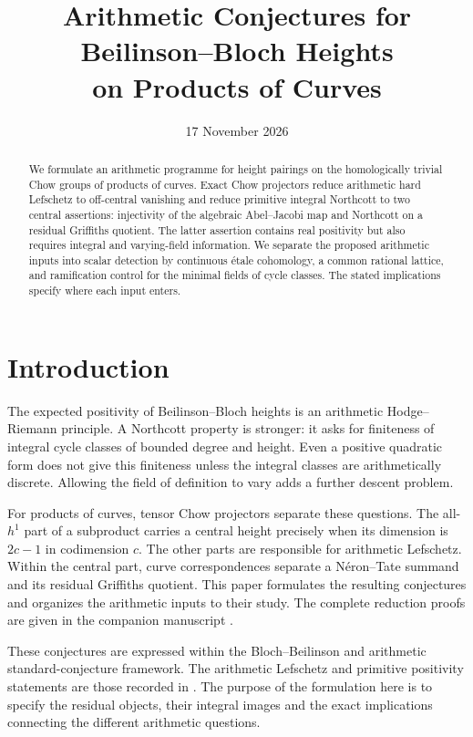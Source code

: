 \documentclass[11pt,a4paper]{article}
\title{Arithmetic Conjectures for Beilinson--Bloch Heights\\
on Products of Curves}
\author{}
\date{17 November 2026}
\theoremstyle{definition}
\numberwithin{equation}{section}
\begin{document}
\maketitle
\begin{abstract}
We formulate an arithmetic programme for height pairings on the
homologically trivial Chow groups of products of curves. Exact
Chow projectors reduce arithmetic hard Lefschetz to off-central
vanishing and reduce primitive integral Northcott to two central
assertions: injectivity of the algebraic Abel--Jacobi map and
Northcott on a residual Griffiths quotient. The latter assertion
contains real positivity but also requires integral and
varying-field information. We separate the proposed arithmetic
inputs into scalar detection by continuous étale cohomology,
a common rational lattice, and ramification control for the
minimal fields of cycle classes. The stated implications specify
where each input enters.
\end{abstract}
{\hypersetup{linkcolor=MathSectionLink}\tableofcontents}

\section{Introduction}\label{sec:introduction}

The expected positivity of Beilinson--Bloch heights is an arithmetic
Hodge--Riemann principle. A Northcott property is stronger: it asks
for finiteness of integral cycle classes of bounded degree and
height. Even a positive quadratic form does not give this
finiteness unless the integral classes are arithmetically discrete.
Allowing the field of definition to vary adds a further descent
problem.

For products of curves, tensor Chow projectors separate these
questions. The all-\(h^1\) part of a subproduct carries a central
height precisely when its dimension is \(2c-1\) in codimension
\(c\). The other parts are responsible for arithmetic Lefschetz.
Within the central part, curve correspondences separate a
Néron--Tate summand and its residual Griffiths quotient. This
paper formulates the resulting conjectures and organizes the
arithmetic inputs to their study. The complete reduction proofs
are given in the companion manuscript \cite{ArithmeticReductions}.

These conjectures are expressed within the Bloch--Beilinson
and arithmetic standard-conjecture framework. The arithmetic
Lefschetz and primitive positivity statements are those recorded
in \cite[Conjecture~2.3.1]{ZhangStandard}. The purpose of the
formulation here is to specify the residual objects, their
integral images and the exact implications connecting the
different arithmetic questions.
\end{document}
